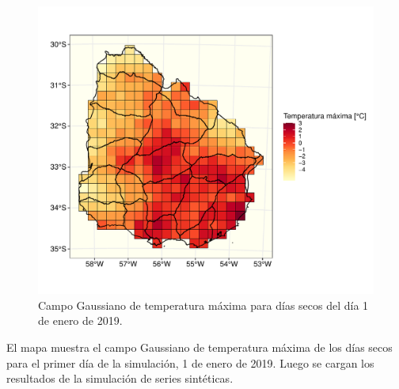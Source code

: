 \documentclass[
  12pt]{article}
\newenvironment{Shaded}{}{}
\newcommand{\CommentTok}[1]{\textcolor[rgb]{0.38,0.63,0.69}{\textit{#1}}}
\newcommand{\DataTypeTok}[1]{\textcolor[rgb]{0.56,0.13,0.00}{#1}}
\newcommand{\KeywordTok}[1]{\textcolor[rgb]{0.00,0.44,0.13}{\textbf{#1}}}
\newcommand{\NormalTok}[1]{#1}
\newcommand{\OperatorTok}[1]{\textcolor[rgb]{0.40,0.40,0.40}{#1}}
\newcommand{\StringTok}[1]{\textcolor[rgb]{0.25,0.44,0.63}{#1}}
\begin{document}
\begin{figure}[H]

{\centering \includegraphics{Manual_Generador_files/figure-latex/grilla-tmax-tiempo-1} 

}

\caption{Campo Gaussiano de temperatura máxima para días secos del día 1 de enero de 2019.}\label{fig:grilla-tmax-tiempo}
\end{figure}

El mapa muestra el campo Gaussiano de temperatura máxima de los días secos para el primer día de la simulación, 1 de enero de 2019. Luego se cargan los resultados de la simulación de series sintéticas.

\begin{Shaded}
\end{Shaded}
\end{document}
